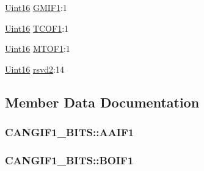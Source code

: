 \begin{DoxyCompactItemize}
\item 
\hyperlink{_d_s_p2833x___device_8h_a59a9f6be4562c327cbfb4f7e8e18f08b}{Uint16} \hyperlink{struct_c_a_n_g_i_f1___b_i_t_s_a52be9c7bc2c06cd6c239e8217ebcd1d8}{G\+M\+I\+F1}\+:1
\item 
\hyperlink{_d_s_p2833x___device_8h_a59a9f6be4562c327cbfb4f7e8e18f08b}{Uint16} \hyperlink{struct_c_a_n_g_i_f1___b_i_t_s_a8d57222b7b7f704bc82dcbcf5c428b1f}{T\+C\+O\+F1}\+:1
\item 
\hyperlink{_d_s_p2833x___device_8h_a59a9f6be4562c327cbfb4f7e8e18f08b}{Uint16} \hyperlink{struct_c_a_n_g_i_f1___b_i_t_s_afa39e5948fe8e0944e5838d632ffe45e}{M\+T\+O\+F1}\+:1
\item 
\hyperlink{_d_s_p2833x___device_8h_a59a9f6be4562c327cbfb4f7e8e18f08b}{Uint16} \hyperlink{struct_c_a_n_g_i_f1___b_i_t_s_a63efcc430adbdfcaa6054844ca303b69}{rsvd2}\+:14
\end{DoxyCompactItemize}


\subsection{Member Data Documentation}
\hypertarget{struct_c_a_n_g_i_f1___b_i_t_s_a04afe46905cdc921a9e7cd6d1f070047}{}
\subsubsection[{A\+A\+I\+F1}]{ C\+A\+N\+G\+I\+F1\+\_\+\+B\+I\+T\+S\+::\+A\+A\+I\+F1}\label{struct_c_a_n_g_i_f1___b_i_t_s_a04afe46905cdc921a9e7cd6d1f070047}
\hypertarget{struct_c_a_n_g_i_f1___b_i_t_s_a8812ae2d41d756b912b7b5a569e7da4f}{}
\subsubsection[{B\+O\+I\+F1}]{ C\+A\+N\+G\+I\+F1\+\_\+\+B\+I\+T\+S\+::\+B\+O\+I\+F1}\label{struct_c_a_n_g_i_f1___b_i_t_s_a8812ae2d41d756b912b7b5a569e7da4f}
\hypertarget{struct_c_a_n_g_i_f1___b_i_t_s_a5ca8d2a47e3970117775ff1c7e472e23}{}
